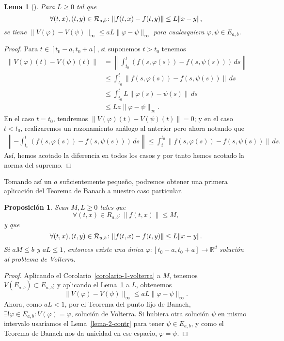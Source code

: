 \documentclass[11pt]{article}
\theoremstyle{plain}
\newtheorem{proposition}{Proposición}
\newtheorem{lemma}{Lema}
\theoremstyle{definition}
\theoremstyle{remark}
\begin{document}
\begin{lemma}[]\label{lema-3-contr}
  Para $L \geq 0$ tal que
  \[
    \forall (t,x),(t,y) \in {\cal R}_{a,b}\colon
    \| f(t,x) - f(t,y) \| \leq L \|x-y\|, 
  \]
  se tiene $\|V(\varphi) - V(\psi)\|_\infty \leq aL\|\varphi - \psi\|_\infty$ para cualesquiera $\varphi,\psi \in E_{a,b}$.
\end{lemma}
\begin{proof}
  Para $t \in [t_0-a,t_0+a]$, si suponemos $t > t_0$ tenemos
  \[\begin{aligned}
  \| V(\varphi)(t) - V(\psi)(t) \| &=
  \left\| \int_{t_0}^t \left( f(s,\varphi(s)) - f(s,\psi(s)) \right)\,ds \right\| \\&\leq
  \int_{t_0}^t \left\|  f(s,\varphi(s)) - f(s,\psi(s)) \right\|\,ds \\&\leq
  \int_{t_0}^t L\left\| \varphi(s)-\psi(s) \right\|\,ds \\&\leq
  La\|\varphi-\psi\|_{\infty}.
  \end{aligned}\]
En el caso $t = t_0$, tendremos $\|V(\varphi)(t) - V(\psi)(t)\| = 0$;
y en el caso $t < t_0$, realizaremos un razonamiento análogo al anterior
pero ahora notando que
\[\begin{aligned}
  \left\| - \int_{t_0}^t  (f(s,\varphi(s)) - f(s,\psi(s))) \,ds \right\| \leq
  \int_{t}^{t_0} \left\|  f(s,\varphi(s)) - f(s,\psi(s)) \right\|\,ds.
\end{aligned}\]
Así, hemos acotado la diferencia en todos los casos y por tanto hemos
acotado la norma del supremo.
\end{proof}

Tomando así un $a$ suficientemente pequeño, podremos obtener una primera
aplicación del Teorema de Banach a nuestro caso particular.

\begin{proposition}\label{proposicion-1-contr}
Sean $M,L \geq 0$ tales que
\[
\forall (t,x) \in R_{a,b}\colon \|f(t,x)\| \leq M,
\]
y que
\[
\forall (t,x),(t,y) \in {\cal R}_{a,b}\colon \|f(t,x)-f(t,y)\| \leq L\|x-y\|.
\]
Si $aM\leq b$ y $aL \leq 1$, entonces existe una única $\varphi\colon [t_0-a,t_0+a] \to \mathbb{R}^d$
solución al problema de Volterra.
\end{proposition}
\begin{proof}
Aplicando el Corolario~\ref{corolario-1-volterra} a $M$, tenemos $V(E_{a,b}) \subset E_{a,b}$;
y aplicando el Lema~\ref{lema-3-contr} a $L$, obtenemos
\[
\| V(\varphi) - V(\psi) \|_{\infty} \leq aL\|\varphi-\psi\|_{\infty}.
\]
Ahora, como $aL < 1$, por el Teorema del punto fijo de Banach, $\exists! \varphi \in E_{a,b} \colon V(\varphi) = \varphi$,
solución de Volterra. Si hubiera otra solución $\psi$ en mismo intervalo usaríamos
el Lema~\ref{lema-2-contr} para tener $\psi \in E_{a,b}$, y como el Teorema de Banach nos
da unicidad en ese espacio, $\varphi = \psi$.
\end{proof}
\end{document}
